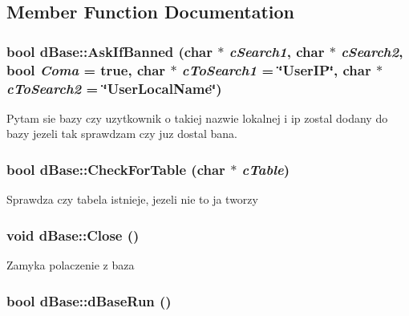 \subsection{Member Function Documentation}
\hypertarget{classdBase_a9afd72b6a6dbb29f0ae100d5f04cc119}{
\subsubsection[{AskIfBanned}]{\setlength{\rightskip}{0pt plus 5cm}bool dBase::AskIfBanned (char $\ast$ {\em cSearch1}, \/  char $\ast$ {\em cSearch2}, \/  bool {\em Coma} = {\ttfamily true}, \/  char $\ast$ {\em cToSearch1} = {\ttfamily \char`\"{}UserIP\char`\"{}}, \/  char $\ast$ {\em cToSearch2} = {\ttfamily \char`\"{}UserLocalName\char`\"{}})}}
\label{classdBase_a9afd72b6a6dbb29f0ae100d5f04cc119}


Pytam sie bazy czy uzytkownik o takiej nazwie lokalnej i ip zostal dodany do bazy jezeli tak sprawdzam czy juz dostal bana.

\hypertarget{classdBase_a8dcd257825f5b4543cf07b766b0e6cd8}{
\subsubsection[{CheckForTable}]{\setlength{\rightskip}{0pt plus 5cm}bool dBase::CheckForTable (char $\ast$ {\em cTable})}}
\label{classdBase_a8dcd257825f5b4543cf07b766b0e6cd8}


Sprawdza czy tabela istnieje, jezeli nie to ja tworzy 

\hypertarget{classdBase_a0c8962454c0efe44b216c28bbd04eb9a}{
\subsubsection[{Close}]{\setlength{\rightskip}{0pt plus 5cm}void dBase::Close ()}}
\label{classdBase_a0c8962454c0efe44b216c28bbd04eb9a}


Zamyka polaczenie z baza 

\hypertarget{classdBase_aea02faef6ec0330213d2d5e6e7449940}{
\subsubsection[{dBaseRun}]{\setlength{\rightskip}{0pt plus 5cm}bool dBase::dBaseRun ()}}
\label{classdBase_aea02faef6ec0330213d2d5e6e7449940}


